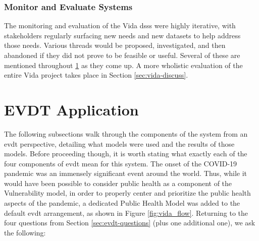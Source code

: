 \subsubsection{Monitor and Evaluate Systems}

The monitoring and evaluation of the Vida \acp{dss} were highly iterative, with stakeholders regularly surfacing new needs and new datasets to help address those needs. Various threads would be proposed, investigated, and then abandoned if they did not prove to be feasible or useful. Several of these are mentioned throughout \ref{sec:vida-evdt} as they come up. A more wholistic evaluation of the entire Vida project takes place in Section \ref{sec:vida-discuss}.

\section{EVDT Application} \label{sec:vida-evdt}

The following subsections walk through the components of the system from an \acf{evdt} perspective, detailing what models were used and the results of those models. Before proceeding though, it is worth stating what exactly each of the four components of \ac{evdt} mean for this system. The onset of the COVID-19 pandemic was an immensely significant event around the world. Thus, while it would have been possible to consider public health as a component of the Vulnerability model, in order to properly center and prioritize the public health aspects of the pandemic, a dedicated Public Health Model was added to the default \ac{evdt} arrangement, as shown in Figure \ref{fig:vida_flow}. Returning to the four questions from Section \ref{sec:evdt-questions} (plus one additional one), we ask the following:


